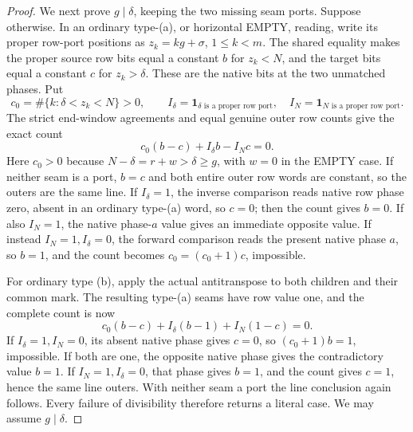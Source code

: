 \documentclass[11pt,a4paper]{amsart}
\numberwithin{equation}{section}
\theoremstyle{plain}
\theoremstyle{definition}
\newcommand{\one}{\mathbf1}
\begin{document}
\begin{proof}
We next prove \(g\mid\delta\), keeping the two missing seam ports.
Suppose otherwise.  In an ordinary type-(a), or horizontal EMPTY,
reading, write its proper row-port positions as
\(z_k=kg+\sigma\), \(1\le k<m\).  The shared equality makes the
proper source row bits equal a constant \(b\) for \(z_k<N\), and
the target bits equal a constant \(c\) for \(z_k>\delta\).
These are the native bits at the two unmatched phases.  Put
\[
 c_0=\#\{k:\delta<z_k<N\}>0,\qquad
 I_\delta=\one_{\delta\text{ is a proper row port}},
 \quad I_N=\one_{N\text{ is a proper row port}}.
\]
The strict end-window agreements and equal genuine outer row counts give
the exact count
\begin{equation}\label{ge:eq:seam-count-zero}
 c_0(b-c)+I_\delta b-I_Nc=0.
\end{equation}
Here \(c_0>0\) because \(N-\delta=r+w>\delta\ge g\), with
\(w=0\) in the EMPTY case.  If neither seam is a port, \(b=c\)
and both entire outer row words are constant, so the outers are the same
line.  If \(I_\delta=1\), the inverse comparison reads native
row phase zero, absent in an ordinary type-(a) word, so \(c=0\);
then the count gives \(b=0\).  If also \(I_N=1\), the native
phase-\(a\) value gives an immediate opposite value.  If instead
\(I_N=1,I_\delta=0\), the forward comparison reads the present
native phase \(a\), so \(b=1\), and the count becomes
\(c_0=(c_0+1)c\), impossible.

For ordinary type (b), apply the actual antitranspose to both children
and their common mark.  The resulting type-(a) seams have row value one,
and the complete count is now
\begin{equation}\label{ge:eq:seam-count-one}
 c_0(b-c)+I_\delta(b-1)+I_N(1-c)=0.
\end{equation}
If \(I_\delta=1,I_N=0\), its absent native phase gives \(c=0\),
so \((c_0+1)b=1\), impossible.  If both are one, the opposite
native phase gives the contradictory value \(b=1\).  If
\(I_N=1,I_\delta=0\), that phase gives \(b=1\), and the count
gives \(c=1\), hence the same line outers.  With neither seam a
port the line conclusion again follows.  Every failure of divisibility
therefore returns a literal case.  We may assume \(g\mid\delta\).


\end{proof}
\end{document}
